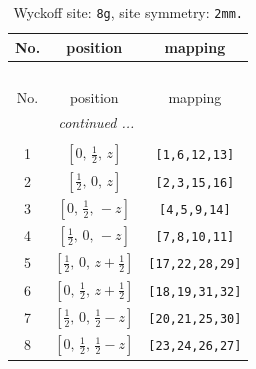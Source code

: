 \documentclass[fleqn,8pt]{jsarticle}
\begin{document}
\begin{longtable}{ccc}
\caption{Wyckoff site: {\tt 8g}, site symmetry: {\tt 2mm.}}
 \\
 \hline \hline
No. & position & mapping \\ \hline \endfirsthead

\multicolumn{2}{l}{\tablename\ \thetable{}} \\
 \hline \hline
No. & position & mapping \\ \hline \endhead

 \hline \hline
\multicolumn{2}{r}{\footnotesize\it continued ...} \\ \endfoot

 \hline \hline
\multicolumn{2}{r}{} \\ \endlastfoot

1 & $\left[ 0,\, \frac{1}{2},\, z \right]$ & {\tt [1,6,12,13]} \\ \hline
2 & $\left[ \frac{1}{2},\, 0,\, z \right]$ & {\tt [2,3,15,16]} \\ \hline
3 & $\left[ 0,\, \frac{1}{2},\, - z \right]$ & {\tt [4,5,9,14]} \\ \hline
4 & $\left[ \frac{1}{2},\, 0,\, - z \right]$ & {\tt [7,8,10,11]} \\ \hline
5 & $\left[ \frac{1}{2},\, 0,\, z + \frac{1}{2} \right]$ & {\tt [17,22,28,29]} \\ \hline
6 & $\left[ 0,\, \frac{1}{2},\, z + \frac{1}{2} \right]$ & {\tt [18,19,31,32]} \\ \hline
7 & $\left[ \frac{1}{2},\, 0,\, \frac{1}{2} - z \right]$ & {\tt [20,21,25,30]} \\ \hline
8 & $\left[ 0,\, \frac{1}{2},\, \frac{1}{2} - z \right]$ & {\tt [23,24,26,27]} \\
\end{longtable}
\renewcommand{\arraystretch}{1.2}
\end{document}

